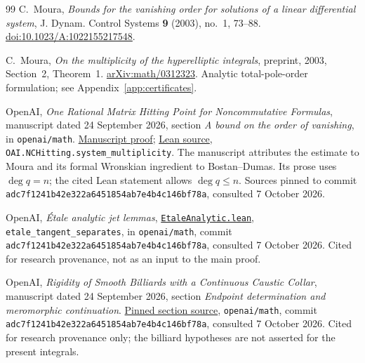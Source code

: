 \documentclass[11pt]{article}
\numberwithin{equation}{section}
\theoremstyle{definition}\newtheorem{definition}[theorem]{Definition}
\theoremstyle{remark}\newtheorem{remark}[theorem]{Remark}
\begin{document}
\begin{thebibliography}{99}
C.~Moura, \emph{Bounds for the vanishing order for solutions of a linear
differential system}, J. Dynam. Control Systems \textbf{9} (2003),
no.~1, 73--88.
\href{https://doi.org/10.1023/A:1022155217548}{doi:10.1023/A:1022155217548}.

C.~Moura, \emph{On the multiplicity of the hyperelliptic integrals},
preprint, 2003, Section~2, Theorem~1.
\href{https://arxiv.org/abs/math/0312323}{arXiv:math/0312323}.
Analytic total-pole-order formulation; see Appendix~\ref{app:certificates}.

OpenAI, \emph{One Rational Matrix Hitting Point for Noncommutative
Formulas}, manuscript dated 24 September 2026, section
\emph{A bound on the order of vanishing}, in \texttt{openai/math}.
\href{https://github.com/openai/math/blob/adc7f1241b42e322a6451854ab7e4b4c146bf78a/preprints/One-Rational-Matrix-Hitting-Point-for-Noncommutative-Formulas-September-24-2026/build/multiplicity.tex}{Manuscript proof};
\href{https://github.com/openai/math/blob/adc7f1241b42e322a6451854ab7e4b4c146bf78a/lean/OAI/Algebra/FormulaHitting/Multiplicity.lean}{Lean source},
\texttt{OAI.NCHitting.}\allowbreak\texttt{system\_multiplicity}.
The manuscript attributes the estimate to Moura and its formal
Wronskian ingredient to Bostan--Dumas. Its prose uses $\deg q=n$;
the cited Lean statement allows $\deg q\le n$. Sources pinned to
commit \texttt{adc7f1241b42e322a6451854ab7e4b4c146bf78a},
consulted 7 October 2026.

OpenAI, \emph{\'Etale analytic jet lemmas},
\href{https://github.com/openai/math/blob/adc7f1241b42e322a6451854ab7e4b4c146bf78a/lean/OAI/AlgebraicGeometry/Seshadri/Jets/EtaleAnalytic.lean}{\texttt{EtaleAnalytic.lean}},
\texttt{etale\_tangent\_separates}, in \texttt{openai/math},
commit \texttt{adc7f1241b42e322a6451854ab7e4b4c146bf78a},
consulted 7 October 2026. Cited for research provenance, not as an
input to the main proof.

OpenAI, \emph{Rigidity of Smooth Billiards with a Continuous Caustic
Collar}, manuscript dated 24 September 2026, section
\emph{Endpoint determination and meromorphic continuation}.
\href{https://github.com/openai/math/blob/adc7f1241b42e322a6451854ab7e4b4c146bf78a/preprints/Rigidity-of-Smooth-Billiards-with-a-Continuous-Caustic-Collar-September-24-2026/build/sections/04-continuation.tex}{Pinned section source},
\texttt{openai/math}, commit
\texttt{adc7f1241b42e322a6451854ab7e4b4c146bf78a},
consulted 7 October 2026. Cited for research provenance only; the
billiard hypotheses are not asserted for the present integrals.
\end{thebibliography}
\end{document}
